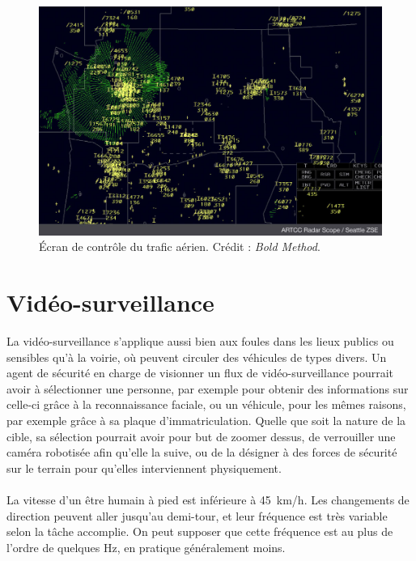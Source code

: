 	\begin{figure}[ht]
		\centering
		\includegraphics[width=\textwidth]{figures/Radar-Scope-ZSE}
		\caption{Écran de contrôle du trafic aérien. Crédit : \emph{Bold Method}.}
		\label{fig:airtraffic}
	\end{figure}
	
	\section{Vidéo-surveillance}
	La vidéo-surveillance s'applique aussi bien aux foules dans les lieux publics ou sensibles qu'à la voirie, où peuvent circuler des véhicules de types divers. Un agent de sécurité en charge de visionner un flux de vidéo-surveillance pourrait avoir à sélectionner une personne, par exemple pour obtenir des informations sur celle-ci grâce à la reconnaissance faciale, ou un véhicule, pour les mêmes raisons, par exemple grâce à sa plaque d'immatriculation. Quelle que soit la nature de la cible, sa sélection pourrait avoir pour but de zoomer dessus, de verrouiller une caméra robotisée afin qu'elle la suive, ou de la désigner à des forces de sécurité sur le terrain pour qu'elles interviennent physiquement.
	
	\paragraph{}
	La vitesse d'un être humain à pied est inférieure à 45~km/h. Les changements de direction peuvent aller jusqu'au demi-tour, et leur fréquence est très variable selon la tâche accomplie. On peut supposer que cette fréquence est au plus de l'ordre de quelques Hz, en pratique généralement moins.

